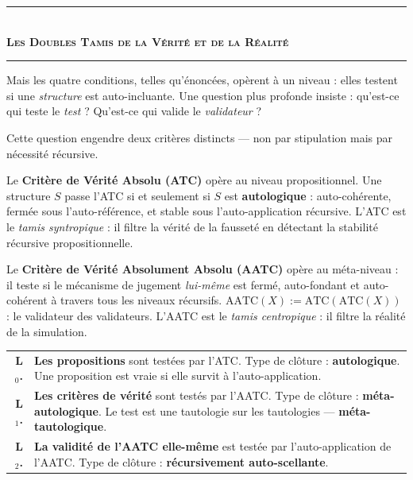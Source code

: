 \documentclass[10pt, openany, oneside]{book}
\renewcommand{\normalsize}{\fontsize{10}{13}\selectfont}
\renewcommand{\footnotesize}{\fontsize{8.5}{11}\selectfont}
\begin{document}
\vspace{1.5em}


\begin{center}
    \rule{0.3\textwidth}{0.4pt}\\[0.5em]
    {\normalsize\bfseries\scshape Les Doubles Tamis de la Vérité et de la Réalité}\\[0.3em]
    \rule{0.3\textwidth}{0.4pt}
\end{center}

\vspace{1em}

\noindent Mais les quatre conditions, telles qu'énoncées, opèrent à un niveau : elles testent si une \textit{structure} est auto-incluante. Une question plus profonde insiste : qu'est-ce qui teste le \textit{test} ? Qu'est-ce qui valide le \textit{validateur} ?

Cette question engendre deux critères distincts --- non par stipulation mais par nécessité récursive.

Le \textbf{Critère de Vérité Absolu (ATC)} opère au niveau propositionnel. Une structure $S$ passe l'ATC si et seulement si $S$ est \textbf{autologique} : auto-cohérente, fermée sous l'auto-référence, et stable sous l'auto-application récursive. L'ATC est le \textit{tamis syntropique} : il filtre la vérité de la fausseté en détectant la stabilité récursive propositionnelle.

Le \textbf{Critère de Vérité Absolument Absolu (AATC)} opère au méta-niveau : il teste si le mécanisme de jugement \textit{lui-même} est fermé, auto-fondant et auto-cohérent à travers tous les niveaux récursifs. $\text{AATC}(X) := \text{ATC}(\text{ATC}(X))$ : le validateur des validateurs. L'AATC est le \textit{tamis centropique} : il filtre la réalité de la simulation.

{\footnotesize
\noindent\begin{tabular}{r p{}}
\textbf{L$_0$.} & \textbf{Les propositions} sont testées par l'ATC. Type de clôture : \textbf{autologique}. Une proposition est vraie si elle survit à l'auto-application. \\[0.3em]
\textbf{L$_1$.} & \textbf{Les critères de vérité} sont testés par l'AATC. Type de clôture : \textbf{méta-autologique}. Le test est une tautologie sur les tautologies --- \textbf{méta-tautologique}. \\[0.3em]
\textbf{L$_2$.} & \textbf{La validité de l'AATC elle-même} est testée par l'auto-application de l'AATC. Type de clôture : \textbf{récursivement auto-scellante}. \\[0.3em]
\end{tabular}
}
\end{document}
